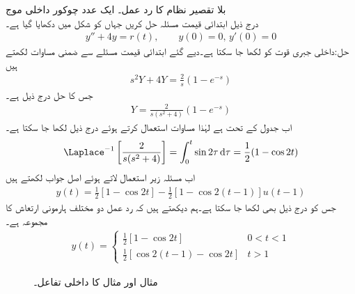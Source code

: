 \quad بلا تقصیر نظام کا رد عمل۔ ایک عدد چوکور داخلی موج\\
درج ذیل ابتدائی قیمت مسئلہ حل کریں جہاں  کو شکل  میں دکھایا گیا ہے۔
\begin{align*}
y''+4y=r(t),\quad \quad y(0)=0, \, y'(0)=0
\end{align*}
حل:داخلی جبری قوت کو  لکھا جا سکتا ہے۔دیے گئے ابتدائی قیمت مسئلے  سے ضمنی مساوات لکھتے ہیں
\begin{align*}
s^2Y+4Y=\frac{2}{s}(1-e^{-s})
\end{align*} 
جس کا حل درج ذیل ہے۔
\begin{align*}
Y=\frac{2}{s(s^2+4)}(1-e^{-s})
\end{align*}
اب جدول  کے تحت  ہے  لہٰذا مساوات  استعمال کرتے ہوئے درج ذیل لکھا جا سکتا ہے۔
\begin{align*}
\Laplace^{-1}\left[\frac{2}{s(s^2+4)}\right]=\int_{0}^{t}\sin 2\tau \dif \tau=\frac{1}{2}(1-\cos 2t)
\end{align*}
اب مسئلہ  زیر استعمال لاتے ہوئے اصل جواب لکھتے ہیں
\begin{align*}
y(t)=\frac{1}{2}[1-\cos 2t]-\frac{1}{2}[1-\cos 2(t-1)]u(t-1)
\end{align*}
جس کو درج ذیل بھی لکھا جا سکتا ہے۔ہم دیکھتے ہیں کہ رد عمل دو مختلف ہارمونی ارتعاش کا مجموعہ ہے۔
\begin{align*}
y(t)=
\begin{cases}
\frac{1}{2}[1-\cos 2t] & 0<t<1\\[0.5ex]
\frac{1}{2}[\cos 2(t-1)-\cos 2t]& t>1
\end{cases}
\end{align*}
%
\begin{figure}
\centering
{}
\caption{مثال  اور مثال  کا داخلی تفاعل۔}
\label{شکل_مثال_لاپلاس_تقصیر_اکائی}
\end{figure}
